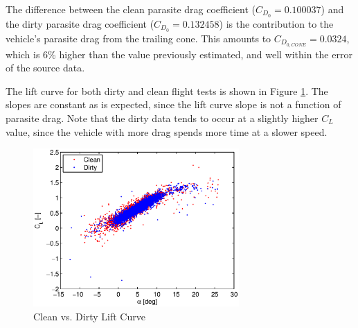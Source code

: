 The difference between the clean parasite drag coefficient ($C_{D_0} = 0.100037$) and the dirty parasite drag coefficient ($C_{D_0} = 0.132458$) is the contribution to the vehicle's parasite drag from the trailing cone. This amounts to $C_{D_{0,CONE}} = 0.0324$, which is 6\% higher than the value previously estimated, and well within the error of the source data.

The lift curve for both dirty and clean flight tests is shown in Figure \ref{fig:CLalphaOverlay}. The slopes are constant as is expected, since the lift curve slope is not a function of parasite drag. Note that the dirty data tends to occur at a slightly higher $C_L$ value, since the vehicle with more drag spends more time at a slower speed.
\begin{figure}[H]
  \centering
    \includegraphics[width=0.7\textwidth]{figures/CLalphaOverlay.eps}
    \caption{Clean vs. Dirty Lift Curve} \label{fig:CLalphaOverlay}
\end{figure}